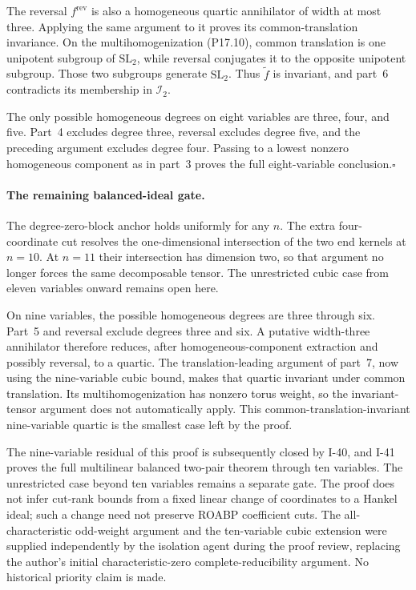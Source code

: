 The reversal $f^{\mathrm{rev}}$ is also a homogeneous quartic
annihilator of width at most three. Applying the same argument
to it proves its common-translation invariance. On the
multihomogenization (P17.10), common translation is one
unipotent subgroup of $\mathrm{SL}_2$, while reversal conjugates
it to the opposite unipotent subgroup. Those two subgroups
generate $\mathrm{SL}_2$. Thus $\widetilde f$ is invariant,
and part~6 contradicts its membership in $\mathcal I_2$.

The only possible homogeneous degrees on eight variables are
three, four, and five. Part~4 excludes degree three, reversal
excludes degree five, and the preceding argument excludes
degree four. Passing to a lowest nonzero homogeneous component
as in part~3 proves the full eight-variable conclusion.\hfill$\square$

\paragraph{The remaining balanced-ideal gate.}
The degree-zero-block anchor holds uniformly for any $n$.
The extra four-coordinate cut resolves the one-dimensional
intersection of the two end kernels at $n=10$. At $n=11$ their
intersection has dimension two, so that argument no longer
forces the same decomposable tensor. The unrestricted cubic
case from eleven variables onward remains open here.

On nine variables, the possible homogeneous degrees are three
through six. Part~5 and reversal exclude degrees three and six.
A putative width-three annihilator therefore reduces, after
homogeneous-component extraction and possibly reversal, to a
quartic. The translation-leading argument of part~7, now using
the nine-variable cubic bound, makes that quartic invariant under
common translation. Its multihomogenization has nonzero torus
weight, so the invariant-tensor argument does not automatically
apply. This common-translation-invariant nine-variable quartic
is the smallest case left by the proof.

The nine-variable residual of this proof is subsequently closed
by I-40, and I-41 proves the full multilinear balanced two-pair
theorem through ten variables. The unrestricted case beyond ten
variables remains a separate gate. The proof does not infer
cut-rank bounds from a fixed linear change of coordinates to a
Hankel ideal; such a change need not preserve ROABP coefficient
cuts. The all-characteristic odd-weight argument and the
ten-variable cubic extension were supplied independently by
the isolation agent during the proof review,
replacing the author's initial characteristic-zero
complete-reducibility argument. No historical priority claim
is made.
